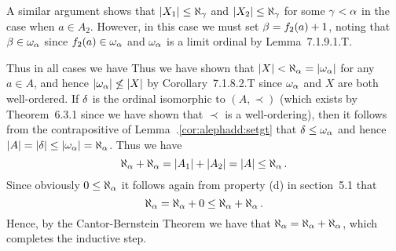 \begin{solution}
    A similar argument shows that $\left| X_1 \right| \leq \aleph_\gamma$ and $\left| X_2 \right| \leq \aleph_\gamma$ for some $\gamma < \alpha$ in the case when $a \in A_2$.
    However, in this case we must set $\beta = f_2(a) + 1$, noting that $\beta \in \omega_\alpha$ since $f_2(a) \in \omega_\alpha$ and $\omega_\alpha$ is a limit ordinal by Lemma~7.1.9.1.T.

    Thus in all cases we have
    Thus we have shown that $\left| X \right| < \aleph_\alpha = \left| \omega_\alpha \right|$ for any $a \in A$, and hence $\left| \omega_\alpha \right| \not\leq \left| X \right|$ by Corollary~7.1.8.2.T since $\omega_\alpha$ and $X$ are both well-ordered.
    If $\delta$ is the ordinal isomorphic to $(A, \prec)$ (which exists by Theorem~6.3.1 since we have shown that $\prec$ is a well-ordering), then it follows from the contrapositive of Lemma~\ex.\ref{cor:alephadd:setgt} that $\delta \leq \omega_\alpha$ and hence $\left| A \right| = \left| \delta \right| \leq \left| \omega_\alpha \right| = \aleph_\alpha$.
    Thus we have
    $$
    \aleph_\alpha + \aleph_\alpha = \left| A_1 \right| + \left| A_2 \right| = \left| A \right| \leq \aleph_\alpha \,.
    $$
    Since obviously $0 \leq \aleph_\alpha$ it follows again from property (d) in section~5.1 that
    $$
    \aleph_\alpha = \aleph_\alpha + 0 \leq \aleph_\alpha + \aleph_\alpha \,.
    $$
    Hence, by the Cantor-Bernstein Theorem we have that $\aleph_\alpha = \aleph_\alpha + \aleph_\alpha$, which completes the inductive step. \qedsymbol
\end{solution}

